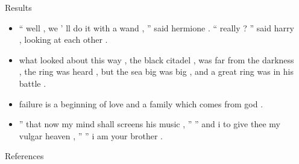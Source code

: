 \documentclass[final]{beamer}
\newcommand{\compresslist}{
  \setlength{\itemsep}{1pt}
  \setlength{\parskip}{0pt}
  \setlength{\parsep}{0pt}}
\newlength{\sepwidth}
\newlength{\colwidth}
\newcommand{\separatorcolumn}{\begin{column}{\sepwidth}\end{column}}
\begin{document}
\begin{frame}[t]
\begin{columns}[t]
\begin{column}{\colwidth}
\begin{block}{Results}
\begin{itemize}\compresslist
    \item `` well , we ' ll do it with a wand , '' said hermione . `` really ?
      '' said harry , looking at each other .
    \item  what looked about this
      way , the black citadel , was far from the
          darkness , the ring was heard , but the sea big was big , and a great
          ring was in his battle .
    \item failure is a beginning of love and a family which comes from god .
    \item  '' that now my mind shall screens his music , '' '' and i to give
      thee my vulgar heaven , '' '' i am your brother .
\end{itemize}
\end{block}
\begin{block}{References}
\printbibliography
\end{block}
\end{column}
\separatorcolumn
\end{columns}
\end{frame}
\end{document}
